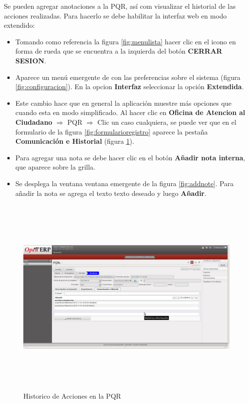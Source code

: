 Se pueden agregar anotaciones a la PQR, así com visualizar el historial de las acciones realizadas. Para hacerlo se debe habilitar
la interfaz web en modo extendido: 

\begin{itemize}
 \item Tomando como referencia la figura \ref{fig:menulista} hacer clic en el icono en forma de rueda que se encuentra a la
 izquierda del botón \textbf{CERRAR SESION}.
 \item Aparece un menú emergente de con las preferencias sobre el sistema (figura \ref{fig:configuracion}). En la opcion
  \textbf{Interfaz} seleccionar la opción \textbf{Extendida}. 
 \item Este cambio hace que en general la aplicación muestre más opciones que cuando esta en modo simplificado. Al hacer 
 clic en \textbf{Oficina de Atencion al Ciudadano} $\Rightarrow$ PQR $\Rightarrow$ Clic un caso cualquiera, se puede ver
 que en el formulario de la figura \ref{fig:formularioregistro} aparece la pestaña \textbf{Comunicación e Historial} 
 (figura \ref{fig:historico}). 
 \item Para agregar una nota se debe hacer clic en el botón \textbf{Añadir nota interna}, que aparece sobre la grilla.
 \item Se desplega la ventana ventana emergente de la figura \ref{fig:addnote}. Para añadir la nota se agrega el texto
 texto deseado y luego \textbf{Añadir}. 
\end{itemize}

\begin{figure}
 \centering
 \includegraphics[width=17cm,height=10cm]{./Imagenes/historico.png}
 \caption{Historico de Acciones en la PQR}
 \label{fig:historico}
\end{figure}


